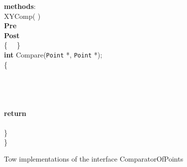 \documentclass[fleqn]{llncs}
\begin{document}
\begin{figure}
\begin{center}
\begin{boxedminipage}{0.8\textwidth}
\begin{tabbing}
\textbf{methods}:\\
    \> XYComp( )\\
    \>  \>\textbf{Pre} \>\>\\
    \>  \>\textbf{Post}\>\>\\
    \>  \>\{ \ \  \}\\
    \>\textbf{int} Compare(\texttt{Point} *, \texttt{Point} *);\\
    \>\{\\
    \>  \>\\
    \>  \>\\
    \>  \>\\
    \>  \>\\
    \>  \>\textbf{return} \\
    \>  \>  \>  \>\ \ \\
    \>\}\\
\}\\
\end{tabbing}
\end{boxedminipage}
\end{center}
\caption{Tow implementations of the interface ComparatorOfPoints}\label{FIG-COMPARATOR-IMP}
\end{figure}
\end{document}
